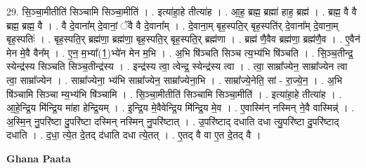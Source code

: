 \documentclass[17pt]{extarticle}
\begin{document}
29. सि॒ञ्चा॒मीतीति॑ सिञ्चामि सिञ्चा॒मीति॑ । . इत्या॑हा॒हे तीत्या॑ह । . आ॒ह॒ ब्रह्म॒ ब्रह्मा॑ हाह॒ ब्रह्म॑ । . ब्रह्म॒ वै वै ब्रह्म॒ ब्रह्म॒ वै । . वै दे॒वाना᳚म् दे॒वानां॒ ॅवै वै दे॒वाना᳚म् । . दे॒वाना॒म् बृह॒स्पति॒र् बृह॒स्पति॑र् दे॒वाना᳚म् दे॒वाना॒म् बृह॒स्पतिः॑ । . बृह॒स्पति॒र् ब्रह्म॑णा॒ ब्रह्म॑णा॒ बृह॒स्पति॒र् बृह॒स्पति॒र् ब्रह्म॑णा । . ब्रह्म॑ णै॒वैव ब्रह्म॑णा॒ ब्रह्म॑णै॒व । . ए॒वैन॑ मेन मे॒वै वैन᳚म् । . ए॒न॒ म॒भ्या᳚(1॒)भ्ये॑न मेन म॒भि । . अ॒भि षि॑ञ्चति सिञ्च त्य॒भ्य॑भि षि॑ञ्चति । . सि॒ञ्च॒तीन्द्र॒ स्येन्द्र॑स्य सिञ्चति सिञ्च॒तीन्द्र॑स्य । . इन्द्र॑स्य त्वा॒ त्वेन्द्र॒ स्येन्द्र॑स्य त्वा । . त्वा॒ साम्रा᳚ज्येन॒ साम्रा᳚ज्येन त्वा त्वा॒ साम्रा᳚ज्येन । . साम्रा᳚ज्येना॒ भ्य॑भि साम्रा᳚ज्येन॒ साम्रा᳚ज्येना॒भि । . साम्रा᳚ज्ये॒नेति॒ सां - रा॒ज्ये॒न॒ । . अ॒भि षि॑ञ्चामि सिञ्चा म्य॒भ्य॑भि षि॑ञ्चामि । . सि॒ञ्चा॒मीतीति॑ सिञ्चामि सिञ्चा॒मीति॑ । . इत्या॑हा॒हे तीत्या॑ह । . आ॒हे॒न्द्रि॒य मि॑न्द्रि॒य मा॑हा हेन्द्रि॒यम् । . इ॒न्द्रि॒य मे॒वैवेन्द्रि॒य मि॑न्द्रि॒य मे॒व । . ए॒वास्मि॑न् नस्मिन् ने॒वै वास्मिन्न्॑ । . अ॒स्मि॒न् नु॒परि॑ष्टा दु॒परि॑ष्टा दस्मिन् नस्मिन् नु॒परि॑ष्टात् । . उ॒परि॑ष्टाद् दधाति दधा त्यु॒परि॑ष्टा दु॒परि॑ष्टाद् दधाति । . द॒धा॒ त्ये॒त दे॒तद् द॑धाति दधा त्ये॒तत् । . ए॒तद् वै वा ए॒त दे॒तद् वै । \newline

\textbf{Ghana Paata } \newline
\end{document}
